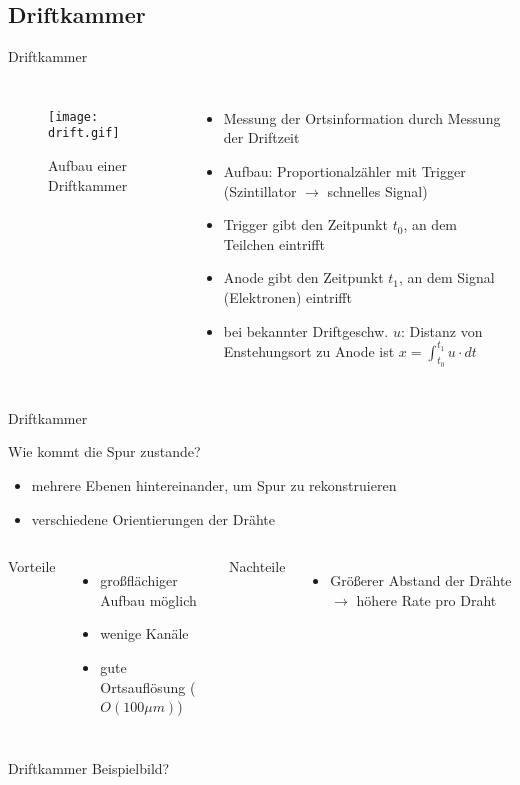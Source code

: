 \subsection[]{Driftkammer}

\begin{frame}{Driftkammer}
    \begin{columns}[T]
			\begin{figure}[htbp]
			  \centering
			  \texttt{[image: drift.gif]}
			  \caption{Aufbau einer Driftkammer}
			\end{figure}
			
	    	\begin{itemize}
	    	  \item Messung der Ortsinformation durch Messung der Driftzeit
			  \item Aufbau: Proportionalzähler mit Trigger (Szintillator $\rightarrow$ schnelles Signal)
			  \item Trigger gibt den Zeitpunkt $t_0$, an dem Teilchen eintrifft
			  \item Anode gibt den Zeitpunkt $t_1$, an dem Signal (Elektronen) eintrifft
			  \item bei bekannter Driftgeschw. $u$: Distanz von Enstehungsort zu Anode ist
			  $x=\int_{t_0}^{t_1}u\cdot dt$
			\end{itemize}
			
    \end{columns}
\end{frame}

\begin{frame}{Driftkammer}

	\begin{block}{Wie kommt die Spur zustande?}
		\begin{itemize}
		  \item mehrere Ebenen hintereinander, um Spur zu rekonstruieren
		  \item verschiedene Orientierungen der Drähte
		\end{itemize}
	\end{block}
	\vspace{0.8cm}
    \begin{columns}[T]
			Vorteile		
			\begin{itemize}
			  \item großflächiger Aufbau möglich
			  \item wenige Kanäle
			  \item gute Ortsauflösung ($O(100\mu m)$)
			\end{itemize}	
	    	Nachteile
	    	\begin{itemize}
			  \item Größerer Abstand der Drähte $\rightarrow$ höhere Rate pro Draht 
			\end{itemize}
    \end{columns}
    \vspace{1cm}
\end{frame}

\begin{frame}{Driftkammer}
    Beispielbild?
\end{frame}